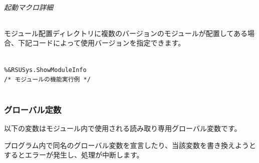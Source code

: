 \paragraph{起動マクロ詳細}
モジュール配置ディレクトリに複数のバージョンのモジュールが配置してある場合、下記コードによって使用バージョンを指定できます。
\begin{lstlisting}[language=SAS, caption={RSU Stepping Stones 起動例（バージョン指定）}, label={code:activation_revised_versioned}, breaklines = true]
%rsu_steppginstones_activate(i_version = 180)							/* モジュール起動（バージョン 1.8.0） */
 
%&RSUSys.ShowModuleInfo															/* モジュールの機能実行例 */
\end{lstlisting}
 
%
%
\part{\DocStrTitleReferenceManual}
 
\chapter{\DocStrTitleRDMReservedMacVars}
\section{グローバル定数}
以下の変数はモジュール内で使用される読み取り専用グローバル変数です。
\begin{marker}
プログラム内で同名のグローバル変数を宣言したり、当該変数を書き換えようとするとエラーが発生し、処理が中断します。
\end{marker}
 
